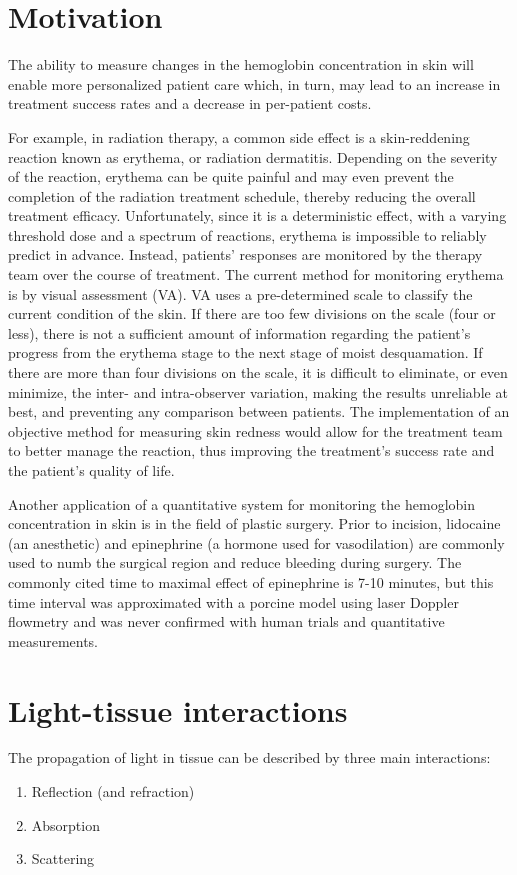 \section{Motivation}
The ability to measure changes in the hemoglobin concentration in skin will enable more personalized patient care which, in turn, may lead to an increase in treatment success rates and a decrease in per-patient costs.

For example, in radiation therapy, a common side effect is a skin-reddening reaction known as erythema, or radiation dermatitis.\cite{McQuestion2006} Depending on the severity of the reaction, erythema can be quite painful and may even prevent the completion of the radiation treatment schedule, thereby reducing the overall treatment efficacy. Unfortunately, since it is a deterministic effect,\cite{Hall2000} with a varying threshold dose and a spectrum of reactions, erythema is impossible to reliably predict in advance. Instead, patients’ responses are monitored by the therapy team over the course of treatment. The current method for monitoring erythema is by visual assessment (VA). VA uses a pre-determined scale to classify the current condition of the skin. If there are too few divisions on the scale (four or less), there is not a sufficient amount of information regarding the patient’s progress from the erythema stage to the next stage of moist desquamation. If there are more than four divisions on the scale, it is difficult to eliminate, or even minimize, the inter- and intra-observer variation, making the results unreliable at best, and preventing any comparison between patients. The implementation of an objective method for measuring skin redness would allow for the treatment team to better manage the reaction, thus improving the treatment’s success rate and the patient’s quality of life.

Another application of a quantitative system for monitoring the hemoglobin concentration in skin is in the field of plastic surgery. Prior to incision, lidocaine (an anesthetic) and epinephrine (a hormone used for vasodilation) are commonly used to numb the surgical region and reduce bleeding during surgery. The commonly cited time to maximal effect of epinephrine is 7-10 minutes, but this time interval was approximated with a porcine model\cite{Larrabee1987} using laser Doppler flowmetry\cite{Swain1989} and was never confirmed with human trials and quantitative measurements.

\section{Light-tissue interactions}
The propagation of light in tissue can be described by three main interactions:\cite{Niemz2007}
\begin{enumerate}
	\item Reflection (and refraction)
	\item Absorption
	\item Scattering
\end{enumerate}

